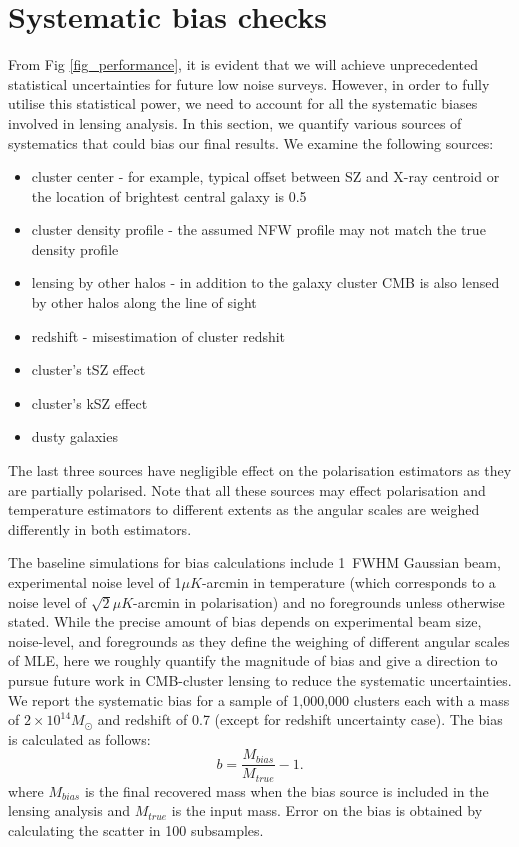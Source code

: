   \section{Systematic bias checks}
  \label{sys_bias}
  From Fig \ref{fig_performance}, it is evident that we will achieve unprecedented statistical uncertainties for future low noise surveys. 
  However, in order to fully utilise this statistical power, we need to account for all the systematic biases involved in lensing analysis. %
    In this section, we quantify various sources of systematics that could bias our final results.
    We examine the following sources:
    \begin{itemize}
    \item cluster center - for example, typical offset between SZ and X-ray centroid or  the location of brightest central galaxy is 0.5 \am\ \citep{saro15, song12b}
    \item cluster density profile - the assumed NFW profile may not match the true density profile
    \item lensing by other halos - in addition to the galaxy cluster CMB is also lensed by other halos along the line of sight 
    \item redshift - misestimation of cluster redshit
    \item cluster's tSZ effect
    \item cluster's kSZ effect
    \item dusty galaxies
    \end{itemize}
    The last three sources have negligible effect on the polarisation estimators as they are partially polarised. 
    Note that all these sources may effect polarisation and temperature estimators to different extents as the angular scales are weighed differently in both estimators. %
     
 The baseline simulations for bias calculations include 1\am\ FWHM Gaussian beam, experimental noise level of 1$\mu K$-arcmin in temperature (which corresponds to a noise level of $\sqrt{2}$$\mu K$-arcmin in polarisation) and no foregrounds unless otherwise stated.
  While the precise amount of bias depends on experimental beam size, noise-level, and foregrounds as they define the weighing of different angular scales of MLE, here we roughly quantify the magnitude of bias and give a direction to pursue future work in CMB-cluster lensing to reduce the systematic uncertainties. 
   We report the systematic bias for a sample of 1,000,000 clusters each with a mass of $2 \times 10^{14}  M_{\odot}$ and redshift of 0.7 (except for redshift uncertainty case). The bias is calculated as follows:
   \begin{equation}
   b = \frac{M_{bias}}{M_{true}} - 1.
   \end{equation}
   where $M_{bias}$ is the final recovered mass when the bias source is included in the lensing analysis and $M_{true}$ is the input mass. 
   Error on the bias is obtained by calculating the scatter in 100 subsamples.
   
